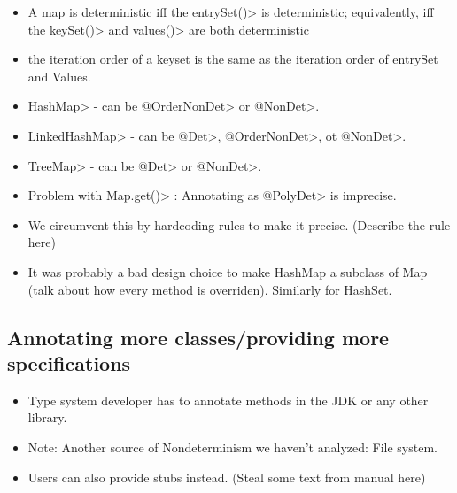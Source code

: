 \begin{itemize}
    \item A map is deterministic iff the \<entrySet()> is
          deterministic; equivalently, iff the \<keySet()> and \<values()>
          are both deterministic
    \item the iteration order of a keyset is the same as the iteration order of entrySet and Values.
    \item \<HashMap> - can be \<@OrderNonDet> or \<@NonDet>.
    \item \<LinkedHashMap> - can be \<@Det>, \<@OrderNonDet>, ot \<@NonDet>.
    \item \<TreeMap> - can be \<@Det> or \<@NonDet>.
    \item Problem with \<Map.get()> : Annotating as \<@PolyDet> is imprecise.
    \item We circumvent this by hardcoding rules to make it precise. (Describe the rule here)
    \item It was probably a bad design choice to make HashMap a subclass of Map (talk about how
    every method is overriden). Similarly for HashSet.
\end{itemize}

\subsection{Annotating more classes/providing more specifications}
\begin{itemize}
    \item Type system developer has to annotate methods in the JDK or any other library.
    \item Note: Another source of Nondeterminism we haven't analyzed: File system.
    \item Users can also provide stubs instead. (Steal some text from manual here)
\end{itemize}

